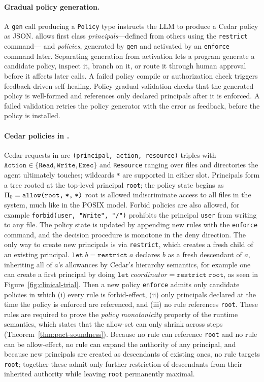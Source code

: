 \paragraph{Gradual policy generation.} A \texttt{gen} call producing a
\texttt{Policy} type instructs the LLM to produce a Cedar policy as JSON. \pact
allows first class \emph{principals}---defined from others using the \texttt{restrict} command---
and \emph{policies}, generated by \texttt{gen} and activated by an \texttt{enforce} command later.
Separating generation from
activation lets a program generate a candidate policy, inspect it,
branch on it, or route it through human approval before it affects later
calls. A failed policy compile or authorization check triggers
feedback-driven self-healing.
Policy gradual validation checks that the generated policy is well-formed and
references only declared principals after it is enforced.
A failed validation retries the policy generator with
the error as feedback, before the policy is installed.

\paragraph{Cedar policies in \pact{}.} Cedar requests in \pact{} are
\texttt{(principal, action, resource)} triples with $\texttt{Action}\in
\{\texttt{Read},\texttt{Write},\texttt{Exec}\}$ and \texttt{Resource}
ranging over files and directories the agent ultimately touches;
wildcards \texttt{*} are supported in either slot. Principals form a
tree rooted at the top-level principal \texttt{root}; the policy
state begins as $\Pi_0 = \texttt{allow(root,\;*,\;*)}$ root is allowed
indiscriminate access to all files in the system, much like in the POSIX
model. Forbid policies are also allowed, for example \texttt{forbid(user, "Write", "/")}
prohibits the principal \texttt{user} from writing to any file. The policy state
is updated by appending new rules with the \texttt{enforce} command, and the
decision procedure is monotone in the deny direction.
The only way to create new principals is via \texttt{restrict}, which
creates a fresh child of an existing principal. 
$\texttt{let}\;b = \texttt{restrict}\;a$ declares $b$ as a fresh
descendant of $a$, inheriting all of $a$'s allowances by Cedar's
hierarchy semantics, for example one can create
a first principal by doing $\texttt{let}\;coordinator = \texttt{restrict}\;\texttt{root}$,
as seen in Figure~\ref{fig:clinical-trial}. Then a new policy
\texttt{enforce} admits only candidate policies in
which (i) every rule is forbid-effect, (ii) only principals
declared at the time the policy is enforced are referenced, and (iii) no rule references \texttt{root}.
These rules are required to prove the \emph{policy monotonicity} property of the runtime semantics, which states that the allow-set can only shrink across steps 
(Theorem~\ref{thm:pact-soundness}).
Because no rule can reference \texttt{root} and no rule can be allow-effect, no
rule can expand the authority of any principal, and because new principals are
created as descendants of existing ones,
no rule targets
\texttt{root}; together these admit only further restriction of
descendants from their inherited authority while leaving \texttt{root}
permanently maximal.

